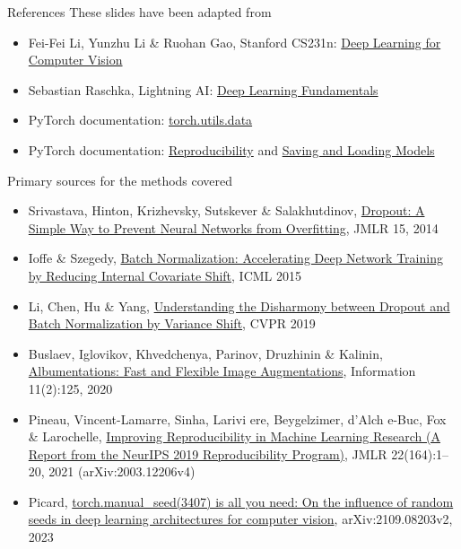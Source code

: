 \begin{frame}[allowframebreaks]{References}
\small
These slides have been adapted from
\begin{itemize}
    \item Fei-Fei Li, Yunzhu Li \& Ruohan Gao, Stanford CS231n: \href{http://cs231n.stanford.edu/index.html}{Deep Learning for Computer Vision}
    \item Sebastian Raschka, Lightning AI: \href{https://lightning.ai/courses/deep-learning-fundamentals}{Deep Learning Fundamentals}
    \item PyTorch documentation: \href{https://pytorch.org/docs/stable/data.html}{torch.utils.data}
    \item PyTorch documentation: \href{https://docs.pytorch.org/docs/stable/notes/randomness.html}{Reproducibility} and \href{https://docs.pytorch.org/tutorials/beginner/saving_loading_models.html}{Saving and Loading Models}
\end{itemize}
\vspace{1em}
Primary sources for the methods covered
\begin{itemize}
    \item Srivastava, Hinton, Krizhevsky, Sutskever \& Salakhutdinov, \href{https://jmlr.org/papers/volume15/srivastava14a/srivastava14a.pdf}{Dropout: A Simple Way to Prevent Neural Networks from Overfitting}, JMLR 15, 2014
    \item Ioffe \& Szegedy, \href{https://arxiv.org/abs/1502.03167}{Batch Normalization: Accelerating Deep Network Training by Reducing Internal Covariate Shift}, ICML 2015
    \item Li, Chen, Hu \& Yang, \href{https://arxiv.org/abs/1801.05134}{Understanding the Disharmony between Dropout and Batch Normalization by Variance Shift}, CVPR 2019
    \item Buslaev, Iglovikov, Khvedchenya, Parinov, Druzhinin \& Kalinin, \href{https://www.mdpi.com/2078-2489/11/2/125}{Albumentations: Fast and Flexible Image Augmentations}, Information 11(2):125, 2020
    \item Pineau, Vincent-Lamarre, Sinha, Larivi ere, Beygelzimer, d'Alch e-Buc, Fox \& Larochelle, \href{https://www.jmlr.org/papers/v22/20-303.html}{Improving Reproducibility in Machine Learning Research (A Report from the NeurIPS 2019 Reproducibility Program)}, JMLR 22(164):1--20, 2021 (arXiv:2003.12206v4)
    \item Picard, \href{https://arxiv.org/abs/2109.08203v2}{torch.manual\_seed(3407) is all you need: On the influence of random seeds in deep learning architectures for computer vision}, arXiv:2109.08203v2, 2023
\end{itemize}
\end{frame}
